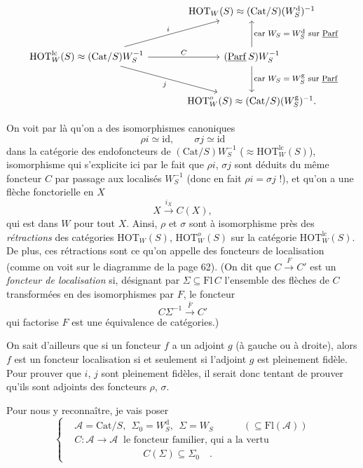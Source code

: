\documentclass[11pt]{article}
\newcommand{\printedpage}[1]{\marginpar{\footnotesize p.~#1}}
\newcommand{\msp}[1]{\marginpar{\footnotesize [#1]}}
\newcommand{\ul}[1]{\underline{\mathrm{#1}}}
\newcommand{\Cat}{\mathrm{Cat}}
\newcommand{\HOT}{\mathrm{HOT}}
\newcommand{\Fl}{\mathrm{Fl}}
\newcommand{\id}{\mathrm{id}}
\newcommand{\cA}{\mathcal{A}}
\begin{document}
\printedpage{39}

\[
\begin{tikzcd}[column sep=large, row sep=large]
 & \HOT_W(S)\approx(\Cat/S)(W_S^{\mathrm{d}})^{-1} \\
\HOT^{\mathrm{lc}}_W(S)\approx(\Cat/S)W_S^{-1} \arrow[ur, "i"] \arrow[r, "C"] \arrow[dr, "j"'] & (\ul{Parf}\,S)W_S^{-1} \arrow[u, "\text{\footnotesize car $W_S=W_S^{\mathrm{d}}$ sur $\ul{Parf}$}"'] \arrow[d, "\text{\footnotesize car $W_S=W_S^{\mathrm{g}}$ sur $\ul{Parf}$}"] \\
 & \HOT^{o}_W(S)\approx(\Cat/S)(W_S^{\mathrm{g}})^{-1}.
\end{tikzcd}
\]

\msp{page 64}
On voit par là qu'on a des isomorphismes canoniques
\[
\rho i\simeq\id,\qquad\sigma j\simeq\id
\]
dans la catégorie des endofoncteurs de $(\Cat/S)W_S^{-1}$ ($\approx\HOT^{\mathrm{lc}}_W(S)$), isomorphisme qui s'explicite ici par le fait que $\rho i$, $\sigma j$ sont déduits du même foncteur $C$ par passage aux localisés $W_S^{-1}$ (donc en fait $\rho i=\sigma j$ !), et qu'on a une flèche fonctorielle en $X$
\[
X\xrightarrow{i_X}C(X),
\]
qui est dans $W$ pour tout $X$. Ainsi, $\rho$ et $\sigma$ sont à isomorphisme près des \textit{rétractions} des catégories $\HOT_W(S)$, $\HOT^{o}_W(S)$ sur la catégorie $\HOT^{\mathrm{lc}}_W(S)$. De plus, ces rétractions sont ce qu'on appelle des foncteurs de localisation (comme on voit sur le diagramme de la page 62). (On dit que $C\xrightarrow{F}C'$ est un \textit{foncteur de localisation} si, désignant par $\Sigma\subseteq\Fl\,C$ l'ensemble des flèches de $C$ transformées en des isomorphismes par $F$, le foncteur
\[
C\Sigma^{-1}\xrightarrow{\bar{F}}C'
\]
qui factorise $F$ est une équivalence de catégories.)

\msp{page 65}
On sait d'ailleurs que si un foncteur $f$ a un adjoint $g$ (à gauche ou à droite), alors $f$ est un foncteur localisation si et seulement si l'adjoint $g$ est pleinement fidèle. Pour prouver que $i$, $j$ sont pleinement fidèles, il serait donc tentant de prouver qu'ils sont adjoints des foncteurs $\rho$, $\sigma$.

Pour nous y reconnaître, je vais poser
\[
\left\{
\begin{aligned}
&\cA=\Cat/S,\ \ \Sigma_0=W_S^{\mathrm{d}},\ \ \Sigma=W_S\qquad\quad(\subseteq\Fl(\cA))\\
&C:\cA\longrightarrow\cA\ \text{ le foncteur familier, qui a la vertu}\\
&\qquad\qquad\qquad\quad C(\Sigma)\subseteq\Sigma_0\quad.
\end{aligned}
\right.
\]
\end{document}
